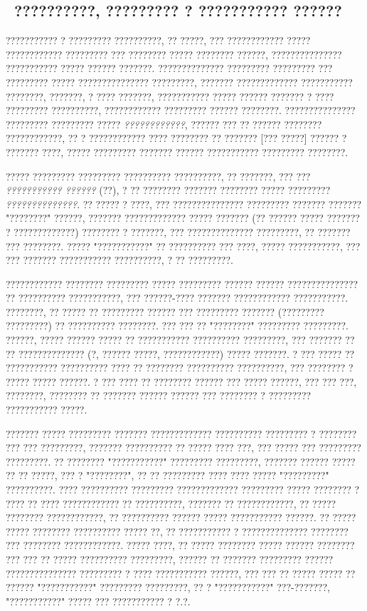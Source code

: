\subsection{ ??????????, ????????? ? ??????????? ??????}

??????????? ? ????????? ??????????, ?? ?????, ??? ???????????? ????? ???????????? ????????? ??? ???????? ????? ???????? ??????, ??????????????? ??????????? ????? ?????? ???????.  ?????????????? ????????? ????????? ??? ????????? ????? ??????????????? ?????????, ??????? ????????????? ??????????? ????????, ???????, ? ???? ???????, ??????????? ????? ?????? ??????? ? ???? ????????? ??????????, ???????????? ????????? ?????? ????????.  ??????????????? ????????? ????????? ????? \emph{????????????}, ?????? ??? ?? ?????? ???????? ????????????, ?? ? ???????????? ???? ???????? ?? ??????? [??? ?????] ?????? ? ??????? ????, ????? ????????? ??????? ?????? ??????????? ????????? ????????.

????? ????????? ????????? ?????????? ??????????, ?? ???????, ??? ??? \emph{??????????? ??????} (??), ? ?? ???????? ??????? ???????? ????? ????????? \emph{??????????????}.  ?? ????? ? ????, ??? ??????????????? ????????? ??????? ??????? "????????" ??????, ??????? ????????????? ????? ??????? (?? ?????? ????? ??????? ? ?????????????) ???????? ? ???????, ??? ?????????????? ?????????, ?? ??????? ??? ????????.  ????? "???????????" ?? ?????????? ??? ????, ????? ???????????, ??? ??? ??????? ??????????? ??????????, ? ?? ?????????.

???????????? ???????? ????????? ????? ????????? ?????? ?????? ??????????????? ?? ?????????? ???????????, ??? ??????-???? ??????? ???????????? ???????????.  ????????, ?? ????? ?? ????????? ?????? ??? ????????? ??????? (????????? ?????????) ?? ?????????? ????????.  ??? ??? ?? "????????" ????????? ?????????.  ??????, ????? ?????? ????? ?? ??????????? ?????????? ?????????, ??? ??????? ?? ?? ?????????????? (?, ?????? ?????, ????????????) ????? ???????.  ? ??? ????? ?? ??????????? ?????????? ???? ?? ???????? ?????????? ??????????, ??? ???????? ? ????? ????? ??????.  ? ??? ???? ?? ???????? ?????? ??? ????? ??????, ??? ??? ???, ????????, ???????? ?? ??????? ?????? ?????? ??? ???????? ? ????????? ??????????? ?????.

??????? ????? ????????? ??????? ????????????? ?????????? ????????? ? ???????? ??? ??? ?????????, ??????? ?????????? ?? ????? ???? ???, ??? ????? ??? ????????? ?????????.  ?? ???????? "???????????" ????????? ?????????, ??????? ?????? ????? ?? ?? ?????, ??? ? "????????", ?? ?? ????????? ???? ???? ????? "?????????" ??????????.  ???? ?????????? ????????? ????????????? ????????? ????? ???????? ? ???? ?? ???? ???????????? ?? ??????????, ??????? ?? ????????????, ?? ????? ???????? ????????????, ?? ?????????? ?????? ????? ??????????? ??????.  ?? ????? ????? ???????? ?????????? ????? ??, ?? ??????????? ? ?????????????? ???????? ??? ???????? ????????????.  ????? ????, ?? ????? ???????? ????? ?????? ???????? ??? ??? ?? ????? ?????????? ?????????, ?????? ?? ??????? ????????? ?????? ??????????????? ????????? ? ???? ??????????? ??????, ??? ??? ?? ????? ????? ?? ?????? "???????????" ????????? ?????????, ?? ? "???????????" ???-???????, "???????????" ????? ??? ??????????? ? ?.?.

